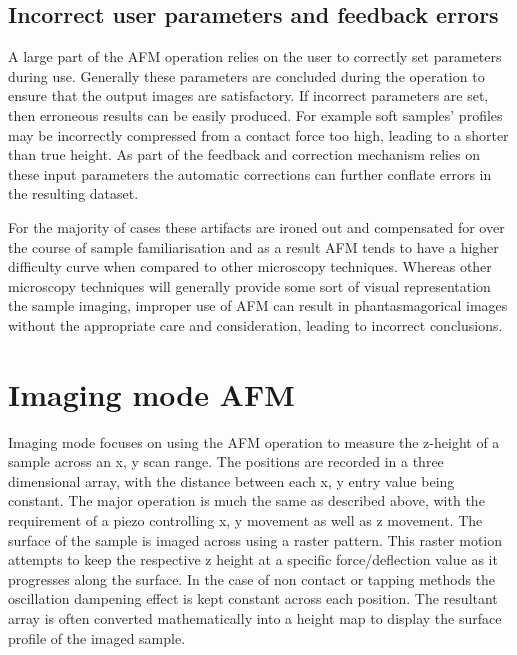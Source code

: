 \subsection{Incorrect user parameters and feedback errors}

A large part of the AFM operation relies on the user to correctly set parameters during use. Generally these parameters are concluded during the operation to ensure that the output images are satisfactory. If incorrect parameters are set, then erroneous results can be easily produced. For example soft samples' profiles may be incorrectly compressed from a contact force too high, leading to a shorter than true height. As part of the feedback and correction mechanism relies on these input parameters the automatic corrections can further conflate errors in the resulting dataset.

For the majority of cases these artifacts are ironed out and compensated for over the course of sample familiarisation and as a result AFM tends to have a higher difficulty curve when compared to other microscopy techniques. Whereas other microscopy techniques will generally provide some sort of visual representation the sample imaging, improper use of AFM can result in phantasmagorical images without the appropriate care and consideration, leading to incorrect conclusions. \cite{AFMBook1}





\section{Imaging mode AFM}

Imaging mode focuses on using the AFM operation to measure the z-height of a sample across an x, y scan range. The positions are recorded in a three dimensional array, with the distance between each x, y entry value being constant. The major operation is much the same as described above, with the requirement of a piezo controlling x, y movement as well as z movement. The surface of the sample is imaged across using a raster pattern. This raster motion attempts to keep the respective z height at a specific force/deflection value as it progresses along the surface. In the case of non contact or tapping methods the oscillation dampening effect is kept constant across each position. The resultant array is often converted mathematically into a height map to display the surface profile of the imaged sample. 

